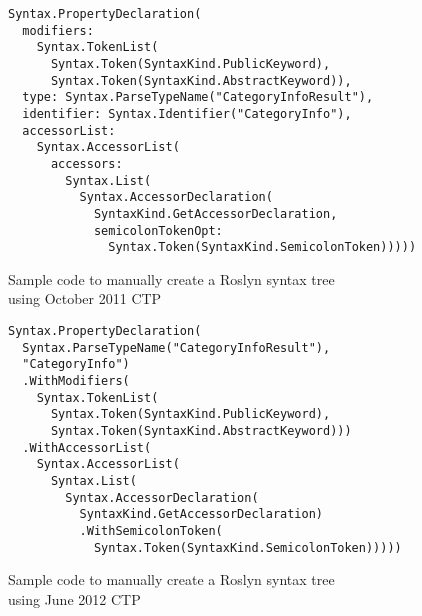 \begin{figure}[p]

\begin{lstlisting}
Syntax.PropertyDeclaration(
  modifiers:
    Syntax.TokenList(
      Syntax.Token(SyntaxKind.PublicKeyword),
      Syntax.Token(SyntaxKind.AbstractKeyword)),
  type: Syntax.ParseTypeName("CategoryInfoResult"),
  identifier: Syntax.Identifier("CategoryInfo"),
  accessorList:
    Syntax.AccessorList(
      accessors:
        Syntax.List(
          Syntax.AccessorDeclaration(
            SyntaxKind.GetAccessorDeclaration,
            semicolonTokenOpt:
              Syntax.Token(SyntaxKind.SemicolonToken)))))
\end{lstlisting}

\caption{Sample code to manually create a Roslyn syntax tree \\ using October 2011 \ac{CTP}}
\label{Roslyn code 2011}
\end{figure}

\begin{figure}[p]

\begin{lstlisting}
Syntax.PropertyDeclaration(
  Syntax.ParseTypeName("CategoryInfoResult"),
  "CategoryInfo")
  .WithModifiers(
    Syntax.TokenList(
      Syntax.Token(SyntaxKind.PublicKeyword),
      Syntax.Token(SyntaxKind.AbstractKeyword)))
  .WithAccessorList(
    Syntax.AccessorList(
      Syntax.List(
        Syntax.AccessorDeclaration(
          SyntaxKind.GetAccessorDeclaration)
          .WithSemicolonToken(
            Syntax.Token(SyntaxKind.SemicolonToken)))))
\end{lstlisting}

\caption{Sample code to manually create a Roslyn syntax tree \\ using June 2012 \ac{CTP}}
\label{Roslyn code 2012}
\end{figure}